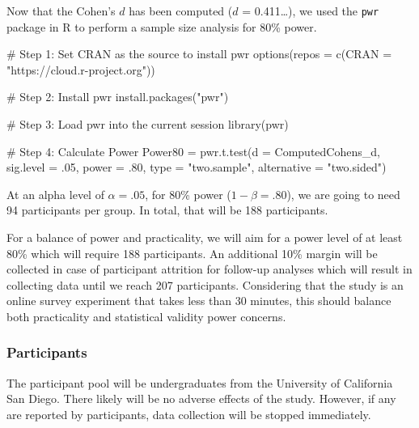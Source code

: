 \documentclass[
  letterpaper,
  DIV=11,
  numbers=noendperiod]{scrartcl}
\newenvironment{Shaded}{\begin{snugshade}}{\end{snugshade}}
\newcommand{\AttributeTok}[1]{\textcolor[rgb]{0.40,0.45,0.13}{#1}}
\newcommand{\CommentTok}[1]{\textcolor[rgb]{0.37,0.37,0.37}{#1}}
\newcommand{\DecValTok}[1]{\textcolor[rgb]{0.68,0.00,0.00}{#1}}
\newcommand{\FunctionTok}[1]{\textcolor[rgb]{0.28,0.35,0.67}{#1}}
\newcommand{\NormalTok}[1]{\textcolor[rgb]{0.00,0.23,0.31}{#1}}
\newcommand{\OtherTok}[1]{\textcolor[rgb]{0.00,0.23,0.31}{#1}}
\newcommand{\StringTok}[1]{\textcolor[rgb]{0.13,0.47,0.30}{#1}}
\begin{document}
Now that the Cohen's \(d\) has been computed (\(d\) = 0.411\ldots), we
used the \texttt{pwr} package in R to perform a sample size analysis for
80\% power.

\begin{Shaded}
\begin{Highlighting}[]
\CommentTok{\# Step 1: Set CRAN as the source to install \textasciigrave{}pwr\textasciigrave{}}
\FunctionTok{options}\NormalTok{(}\AttributeTok{repos =} \FunctionTok{c}\NormalTok{(}\AttributeTok{CRAN =} \StringTok{"https://cloud.r{-}project.org"}\NormalTok{))}

\CommentTok{\# Step 2: Install \textasciigrave{}pwr\textasciigrave{}}
\FunctionTok{install.packages}\NormalTok{(}\StringTok{"pwr"}\NormalTok{)}

\CommentTok{\# Step 3: Load \textasciigrave{}pwr\textasciigrave{} into the current session}
\FunctionTok{library}\NormalTok{(pwr)}

\CommentTok{\# Step 4: Calculate Power}
\NormalTok{Power80 }\OtherTok{=} \FunctionTok{pwr.t.test}\NormalTok{(}\AttributeTok{d =}\NormalTok{ ComputedCohens\_d,}
           \AttributeTok{sig.level =}\NormalTok{ .}\DecValTok{05}\NormalTok{,}
           \AttributeTok{power =}\NormalTok{ .}\DecValTok{80}\NormalTok{,}
           \AttributeTok{type =} \StringTok{"two.sample"}\NormalTok{,}
           \AttributeTok{alternative =} \StringTok{"two.sided"}\NormalTok{)}
\end{Highlighting}
\end{Shaded}

At an alpha level of \(\alpha =.05\), for 80\% power
(\(1 - \beta = .80\)), we are going to need 94 participants per group.
In total, that will be 188 participants.

For a balance of power and practicality, we will aim for a power level
of at least 80\% which will require 188 participants. An additional 10\%
margin will be collected in case of participant attrition for follow-up
analyses which will result in collecting data until we reach 207
participants. Considering that the study is an online survey experiment
that takes less than 30 minutes, this should balance both practicality
and statistical validity power concerns.

\subsubsection{Participants}\label{participants}

The participant pool will be undergraduates from the University of
California San Diego. There likely will be no adverse effects of the
study. However, if any are reported by participants, data collection
will be stopped immediately.
\end{document}

